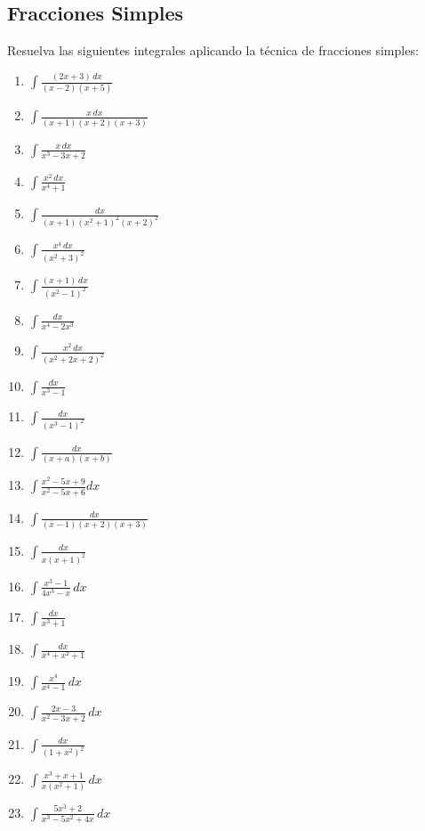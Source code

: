 \documentclass{article}
\begin{document}
\begin{multicols}{2}
\section*{Fracciones Simples}
Resuelva las siguientes integrales aplicando la técnica de fracciones simples:
\begin{enumerate}
    \item $\displaystyle \int \frac{(2x + 3) \, dx}{(x - 2)(x + 5)}$
    \item $\displaystyle \int \frac{x \, dx}{(x + 1)(x + 2)(x + 3)}$
    \item $\displaystyle \int \frac{x \, dx}{x^3 - 3x + 2}$
    \item $\displaystyle \int \frac{x^2 \, dx}{x^4 + 1}$
    \item $\displaystyle \int \frac{dx}{(x + 1)(x^2 + 1)^2(x + 2)^2}$
    \item $\displaystyle \int \frac{x^4 \, dx}{(x^2 + 3)^2}$
    \item $\displaystyle \int \frac{(x + 1) \, dx}{(x^2 - 1)^2}$
    \item $\displaystyle \int \frac{dx}{x^4 - 2x^3}$
    \item $\displaystyle \int \frac{x^2 \, dx}{(x^2 + 2x + 2)^2}$
    \item $\displaystyle \int \frac{dx}{x^3 - 1}$
    \item $\displaystyle \int \frac{dx}{(x^3 - 1)^2}$
    \item $\displaystyle \int \frac{dx}{(x + a)(x + b)}$
    \item $\displaystyle \int \frac{x^2 - 5x + 9}{x^2 - 5x + 6} dx$
    \item $\displaystyle \int \frac{dx}{(x - 1)(x + 2)(x + 3)}$
    \item $\displaystyle \int \frac{dx}{x(x + 1)^2}$
    \item $\displaystyle \int \frac{x^3 - 1}{4x^3 - x} \, dx$
    \item $\displaystyle \int \frac{dx}{x^3 + 1}$
    \item $\displaystyle \int \frac{dx}{x^4 + x^2 + 1}$
    \item $\displaystyle \int \frac{x^4}{x^4 - 1} \, dx$
    \item $\displaystyle \int \frac{2x - 3}{x^2 - 3x + 2} \, dx$
    \item $\displaystyle \int \frac{dx}{(1 + x^2)^2}$
    \item $\displaystyle \int \frac{x^3 + x + 1}{x(x^2 + 1)} \, dx$
    \item $\displaystyle \int \frac{5x^3 + 2}{x^3 - 5x^2 + 4x} \, dx$
\end{enumerate}
\end{multicols}
\end{document}
